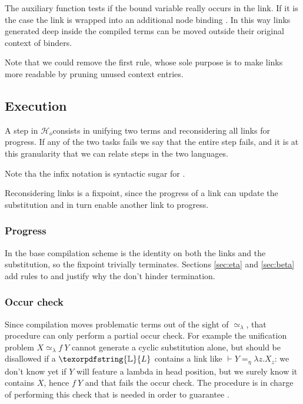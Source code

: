 \documentclass[sigconf,natbib=false,review]{acmart}
\newcommand{\UnifRel}{\ensuremath{\simeq}}
\newcommand{\Ue}{\ensuremath{\UnifRel_\lambda}\xspace}
\newcommand{\Ho}{\texorpdfstring{\ensuremath{\mathcal{H}_o}\xspace}{Ho}}
\newcommand{\linketaM}[3]{\ensuremath{#1 \vdash #2 =_\eta #3}}
\newcommand{\linkStore}{\texorpdfstring{\ensuremath{\mathbb{L}}\xspace}{L}}
\begin{document}
The auxiliary function  tests if the bound variable
 really occurs in the link. If it is the case the link is wrapped into
an additional  node binding . In this way links generated
deep inside the compiled terms can be moved outside their original context
of binders.



\noindent
Note that we could remove the first rule, whose sole purpose is to make
links more readable by pruning unused context entries.

\subsection{Execution}
\label{sec:execution}

A step in \Ho consists in unifying two terms and reconsidering all
links for progress. If any of the two tasks fails we say that the entire step
fails, and it is at this granularity that we can relate steps in the
two languages.




\noindent
Note tha the infix notation \elpiIn{((A ~\Ue~B) C D)} is syntactic sugar for
\elpiIn{((~\Ue\!\!\!~) A B C D)}.

Reconsidering links is a fixpoint, since the progress of a link can update the
substitution and in turn enable another link to progress.



\subsubsection{Progress}
In the base compilation scheme  is the identity
on both the links and the substitution, so the fixpoint trivially terminates.
Sections \ref{sec:eta} and \ref{sec:beta} add rules to 
and justify why the don't hinder termination.

\subsubsection{Occur check}
Since compilation moves problematic terms out of the sight of \Ue{},
that procedure can only perform a partial occur check. For example the
unification problem $X \Ue f~Y$ cannot generate a cyclic substitution alone,
but should be disallowed if a $\linkStore$ contains a link like
$\linketaM{}{Y}{\lambda z.X_z}$: we don't know yet if $Y$ will feature
a lambda in head position, but we surely know it contains $X$, hence
$f~Y$ and that fails the occur check.
The procedure  is in charge of
performing this check that is needed in order to
guarantee .
\end{document}
